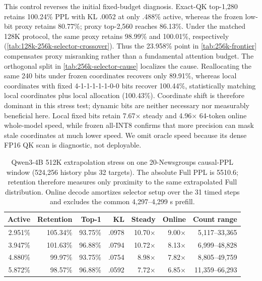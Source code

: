 This control reverses the initial fixed-budget diagnosis.  Exact-QK
top-1,280 retains 100.24\% PPL with KL .0052 at only .488\% active, whereas
the frozen low-bit proxy retains 80.77\%; proxy top-2,560 reaches 86.13\%.
Under the matched 128K protocol, the same proxy retains 98.99\% and
100.01\%, respectively (\cref{tab:128k-256k-selector-crossover}).
Thus the 23.958\% point in \cref{tab:256k-frontier} compensates proxy
misranking rather than a fundamental attention budget.  The orthogonal split
in \cref{tab:256k-selector-cause} localizes the cause.  Reallocating the same
240 bits under frozen coordinates recovers only 89.91\%, whereas local
coordinates with fixed 4-1-1-1-1-1-0-0 bits recover 100.44\%, statistically
matching local coordinates plus local allocation (100.43\%).  Coordinate
shift is therefore dominant in this stress test; dynamic bits are neither
necessary nor measurably beneficial here.  Local fixed bits retain
7.67$\times$ steady and 4.96$\times$ 64-token online whole-model speed,
while frozen all-INT8 confirms that more precision can mask stale
coordinates at much lower speed.  We omit oracle speed because its dense
FP16 QK scan is diagnostic, not deployable.

\begin{table}[!htbp]
\caption{Qwen3-4B 512K extrapolation stress on one 20-Newsgroups causal-PPL
window (524,256 history plus 32 targets).  The absolute Full PPL is 5510.6;
retention therefore measures only proximity to the same extrapolated Full
distribution.  Online decode amortizes selector setup over the 31 timed
steps and excludes the common 4,297--4,299 s prefill.}
\label{tab:512k-extrap-frontier}
\centering
\small
\begin{tabular}{rrrrrrr}
\toprule
Active & Retention & Top-1 & KL & Steady & Online & Count range \\
\midrule
2.951\% & 105.34\% & 93.75\% & .0978 & 10.70$\times$ & 9.00$\times$ &
5,117--33,365 \\
3.947\% & 101.63\% & 96.88\% & .0794 & 10.72$\times$ & 8.13$\times$ &
6,999--48,828 \\
4.880\% & 99.97\% & 93.75\% & .0754 & 8.98$\times$ & 7.82$\times$ &
8,805--49,759 \\
5.872\% & 98.57\% & 96.88\% & .0592 & 7.72$\times$ & 6.85$\times$ &
11,359--66,293 \\
\bottomrule
\end{tabular}
\end{table}

